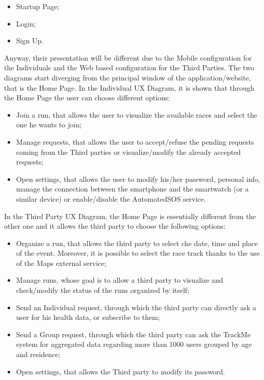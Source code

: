 	\begin{itemize}
	\item Startup Page;
	\item Login;
	\item Sign Up.
	\end{itemize}
Anyway, their presentation will be different due to the Mobile configuration for the Individuals and the Web based configuration for the Third Parties.
The two diagrams start diverging from the principal window of the application/website, that is the Home Page.
In the Individual UX Diagram, it is shown that through the Home Page the user can choose different options:
	\begin{itemize}
	\item Join a run, that allows the user to visualize the available races and select the one he wants to join;
	\item Manage requests, that allows the user to accept/refuse the pending requests coming from the Third parties or visualize/modify the already accepted requests;
	\item Open settings, that allows the user to modify his/her password, personal info, manage the connection between the smartphone and the smartwatch (or a similar device) or enable/disable the AutomatedSOS service.\\ 
	\end{itemize}
In the Third Party UX Diagram, the Home Page is essentially different from the other one and it allows the third party to choose the following options:
	\begin{itemize}
	\item Organize a run, that allows the third party to select che date, time and place of the event. Moreover, it is possible to select the race track thanks to the use of the Maps external service;
	\item Manage runs, whose goal is to allow a third party to visualize and check/modify the status of the runs organized by itself;
	\item Send an Individual request, through which the third party can directly ask a user for his health data, or subscribe to them;
	\item Send a Group request, through which the third party can ask the TrackMe system for aggregated data regarding more than 1000 users grouped by age and residence;
	\item Open settings, that allows the Third party to modify its password.\\
	\end{itemize}

